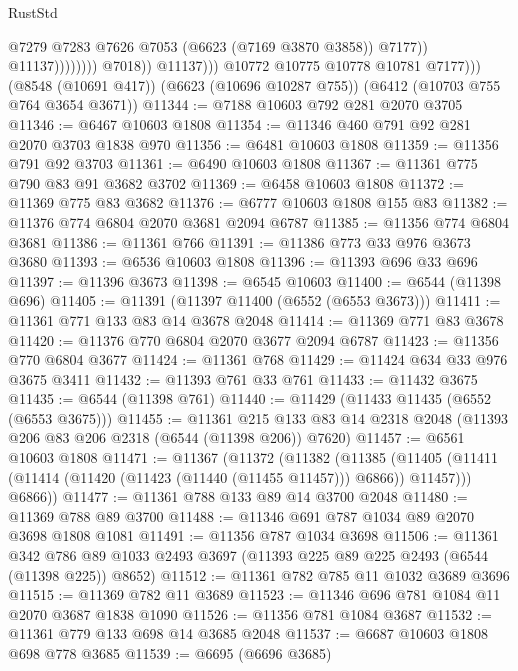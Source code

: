 \begin{lexlean}{RustStd}
\begin{coremodule}
                                        @7279
                                        @7283
                                        @7626
                                        @7053
                                        (@6623 (@7169 @3870 @3858))
                                        @7177))
                                    @11137))))))))
                    @7018))
                @11137)))
          @10772
          @10775
          @10778
          @10781
          @7177)))
    (@8548 (@10691 @417))
    (@6623 (@10696 @10287 @755))
    (@6412 (@10703 @755 @764 @3654 @3671))
@11344 := @7188 @10603 @792 @281 @2070 @3705
@11346 := @6467 @10603 @1808
@11354 := @11346 @460 @791 @92 @281 @2070 @3703 @1838 @970
@11356 := @6481 @10603 @1808
@11359 := @11356 @791 @92 @3703
@11361 := @6490 @10603 @1808
@11367 := @11361 @775 @790 @83 @91 @3682 @3702
@11369 := @6458 @10603 @1808
@11372 := @11369 @775 @83 @3682
@11376 := @6777 @10603 @1808 @155 @83
@11382 := @11376 @774 @6804 @2070 @3681 @2094 @6787
@11385 := @11356 @774 @6804 @3681
@11386 := @11361 @766
@11391 := @11386 @773 @33 @976 @3673 @3680
@11393 := @6536 @10603 @1808
@11396 := @11393 @696 @33 @696
@11397 := @11396 @3673
@11398 := @6545 @10603
@11400 := @6544 (@11398 @696)
@11405 := @11391 (@11397 @11400 (@6552 (@6553 @3673)))
@11411 := @11361 @771 @133 @83 @14 @3678 @2048
@11414 := @11369 @771 @83 @3678
@11420 := @11376 @770 @6804 @2070 @3677 @2094 @6787
@11423 := @11356 @770 @6804 @3677
@11424 := @11361 @768
@11429 := @11424 @634 @33 @976 @3675 @3411
@11432 := @11393 @761 @33 @761
@11433 := @11432 @3675
@11435 := @6544 (@11398 @761)
@11440 := @11429 (@11433 @11435 (@6552 (@6553 @3675)))
@11455 := @11361
    @215
    @133
    @83
    @14
    @2318
    @2048
    (@11393 @206 @83 @206 @2318 (@6544 (@11398 @206)) @7620)
@11457 := @6561 @10603 @1808
@11471 := @11367
    (@11372
      (@11382
        (@11385 (@11405 (@11411 (@11414 (@11420 (@11423 (@11440 (@11455 @11457))) @6866)) @11457)))
        @6866))
@11477 := @11361 @788 @133 @89 @14 @3700 @2048
@11480 := @11369 @788 @89 @3700
@11488 := @11346 @691 @787 @1034 @89 @2070 @3698 @1808 @1081
@11491 := @11356 @787 @1034 @3698
@11506 := @11361
    @342
    @786
    @89
    @1033
    @2493
    @3697
    (@11393 @225 @89 @225 @2493 (@6544 (@11398 @225)) @8652)
@11512 := @11361 @782 @785 @11 @1032 @3689 @3696
@11515 := @11369 @782 @11 @3689
@11523 := @11346 @696 @781 @1084 @11 @2070 @3687 @1838 @1090
@11526 := @11356 @781 @1084 @3687
@11532 := @11361 @779 @133 @698 @14 @3685 @2048
@11537 := @6687 @10603 @1808 @698 @778 @3685
@11539 := @6695 (@6696 @3685)

\end{coremodule}
\end{lexlean}
